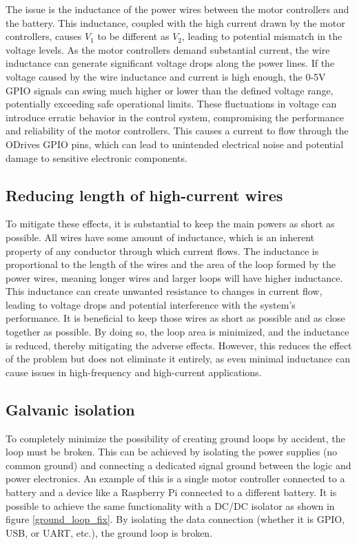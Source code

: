     The issue is the inductance of the power wires between the motor controllers and the battery. This inductance, coupled with the high current drawn by the motor controllers, causes $V_1$ to be different as $V_2$, leading to potential mismatch in the voltage levels. As the motor controllers demand substantial current, the wire inductance can generate significant voltage drops along the power lines. If the voltage caused by the wire inductance and current is high enough, the 0-5V GPIO signals can swing much higher or lower than the defined voltage range, potentially exceeding safe operational limits. These fluctuations in voltage can introduce erratic behavior in the control system, compromising the performance and reliability of the motor controllers. This causes a current to flow through the ODrives GPIO pins, which can lead to unintended electrical noise and potential damage to sensitive electronic components.

    \clearpage
    \subsection{Reducing length of high-current wires}
    
    To mitigate these effects, it is substantial to keep the main powers as short as possible. All wires have some amount of inductance, which is an inherent property of any conductor through which current flows. The inductance is proportional to the length of the wires and the area of the loop formed by the power wires, meaning longer wires and larger loops will have higher inductance. This inductance can create unwanted resistance to changes in current flow, leading to voltage drops and potential interference with the system's performance. It is beneficial to keep those wires as short as possible and as close together as possible. By doing so, the loop area is minimized, and the inductance is reduced, thereby mitigating the adverse effects. However, this reduces the effect of the problem but does not eliminate it entirely, as even minimal inductance can cause issues in high-frequency and high-current applications.
    
    \subsection{Galvanic isolation}
    
    To completely minimize the possibility of creating ground loops by accident, the loop must be broken. This can be achieved by isolating the power supplies (no common ground) and connecting a dedicated signal ground between the logic and power electronics. An example of this is a single motor controller connected to a battery and a device like a Raspberry Pi connected to a different battery. It is possible to achieve the same functionality with a DC/DC isolator as shown in figure \ref{ground_loop_fix}. By isolating the data connection (whether it is GPIO, USB, or UART, etc.), the ground loop is broken.
    
